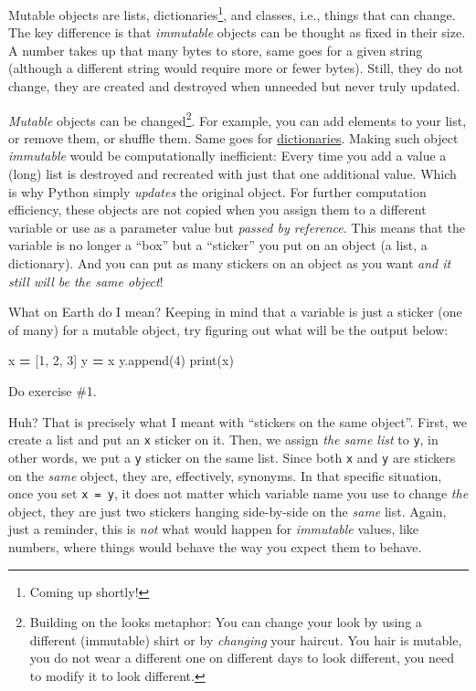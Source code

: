 \documentclass[
]{book}
\newenvironment{Shaded}{\begin{snugshade}}{\end{snugshade}}
\newcommand{\BuiltInTok}[1]{#1}
\newcommand{\DecValTok}[1]{\textcolor[rgb]{0.00,0.00,0.81}{#1}}
\newcommand{\NormalTok}[1]{#1}
\newcommand{\OperatorTok}[1]{\textcolor[rgb]{0.81,0.36,0.00}{\textbf{#1}}}
\begin{document}
Mutable objects are lists, dictionaries\footnote{Coming up shortly!}, and classes, i.e., things that can change. The key difference is that \emph{immutable} objects can be thought as fixed in their size. A number takes up that many bytes to store, same goes for a given string (although a different string would require more or fewer bytes). Still, they do not change, they are created and destroyed when unneeded but never truly updated.

\emph{Mutable} objects can be changed\footnote{Building on the looks metaphor: You can change your look by using a different (immutable) shirt or by \emph{changing} your haircut. You hair is mutable, you do not wear a different one on different days to look different, you need to modify it to look different.}. For example, you can add elements to your list, or remove them, or shuffle them. Same goes for \href{https://docs.python.org/3/tutorial/datastructures.html?highlight=dictionary\#dictionaries}{dictionaries}. Making such object \emph{immutable} would be computationally inefficient: Every time you add a value a (long) list is destroyed and recreated with just that one additional value. Which is why Python simply \emph{updates} the original object. For further computation efficiency, these objects are not copied when you assign them to a different variable or use as a parameter value but \emph{passed by reference}. This means that the variable is no longer a ``box'' but a ``sticker'' you put on an object (a list, a dictionary). And you can put as many stickers on an object as you want \emph{and it still will be the same object}!

What on Earth do I mean? Keeping in mind that a variable is just a sticker (one of many) for a mutable object, try figuring out what will be the output below:

\begin{Shaded}
\begin{Highlighting}[]
\NormalTok{x }\OperatorTok{=}\NormalTok{ [}\DecValTok{1}\NormalTok{, }\DecValTok{2}\NormalTok{, }\DecValTok{3}\NormalTok{]}
\NormalTok{y }\OperatorTok{=}\NormalTok{ x}
\NormalTok{y.append(}\DecValTok{4}\NormalTok{)}
\BuiltInTok{print}\NormalTok{(x)}
\end{Highlighting}
\end{Shaded}

Do exercise \#1.

Huh? That is precisely what I meant with ``stickers on the same object''. First, we create a list and put an \texttt{x} sticker on it. Then, we assign \emph{the same list} to \texttt{y}, in other words, we put a \texttt{y} sticker on the same list. Since both \texttt{x} and \texttt{y} are stickers on the \emph{same} object, they are, effectively, synonyms. In that specific situation, once you set \texttt{x\ =\ y}, it does not matter which variable name you use to change \emph{the} object, they are just two stickers hanging side-by-side on the \emph{same} list. Again, just a reminder, this is \emph{not} what would happen for \emph{immutable} values, like numbers, where things would behave the way you expect them to behave.
\end{document}
